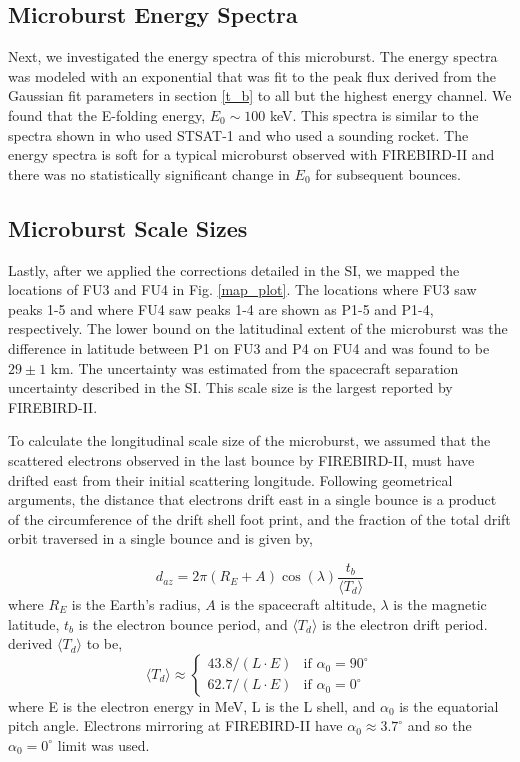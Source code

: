 \documentclass[draft, linenumbers]{agujournal}
\begin{document}
\subsection{Microburst Energy Spectra}
Next, we investigated the energy spectra of this microburst. The energy spectra was modeled with an exponential that was fit to the peak flux derived from the Gaussian fit parameters in section \ref{t_b} to all but the highest energy channel. We found that the E-folding energy, $E_0 \sim 100$ keV. This spectra is similar to the spectra shown in \citet{Lee2005} who used STSAT-1 and \citet{Datta1997} who used a sounding rocket. The energy spectra is soft for a typical microburst observed with FIREBIRD-II and there was no statistically significant change in $E_0$ for subsequent bounces.

\subsection{Microburst Scale Sizes} \label{scale_size} %
Lastly, after we applied the corrections detailed in the SI, we mapped the locations of FU3 and FU4 in Fig. \ref{map_plot}. The locations where FU3 saw peaks 1-5 and where FU4 saw peaks 1-4 are shown as P1-5 and P1-4, respectively. The lower bound on the latitudinal extent of the microburst was the difference in latitude between P1 on FU3 and P4 on FU4 and was found to be $29 \pm 1$ km. The uncertainty was estimated from the spacecraft separation uncertainty described in the SI. This scale size is the largest reported by FIREBIRD-II.

To calculate the longitudinal scale size of the microburst, we assumed that the scattered electrons observed in the last bounce by FIREBIRD-II, must have drifted east from their initial scattering longitude. Following geometrical arguments, the distance that electrons drift east in a single bounce is a product of the circumference of the drift shell foot print, and the fraction of the total drift orbit traversed in a single bounce and is given by, 

\begin{equation}
d_{az} = 2 \pi (R_E + A) \cos(\lambda) \frac{t_b}{\langle T_{d} \rangle}
\label{bounce_drift}
\end{equation} where $R_E$ is the Earth's radius, $A$ is the spacecraft altitude, $\lambda$ is the magnetic latitude, $t_b$ is the electron bounce period, and $\langle T_{d} \rangle$ is the electron drift period. \citet{Parks2003} derived $\langle T_{d} \rangle$ to be,
\begin{equation}
\langle T_{d} \rangle \approx
\begin{cases}
43.8 /(L \cdot E) & \text{if } \alpha_0 = 90^{\circ} \\    62.7/(L \cdot E) & \text{if } \alpha_0 = 0^{\circ}
\end{cases}
\label{drift}
\end{equation} where E is the electron energy in MeV, L is the L shell, and $\alpha_0$ is the equatorial pitch angle. Electrons mirroring at FIREBIRD-II have $\alpha_0 {\approx} 3.7^{\circ}$ and so the $\alpha_0 = 0^{\circ}$ limit was used.
\end{document}
